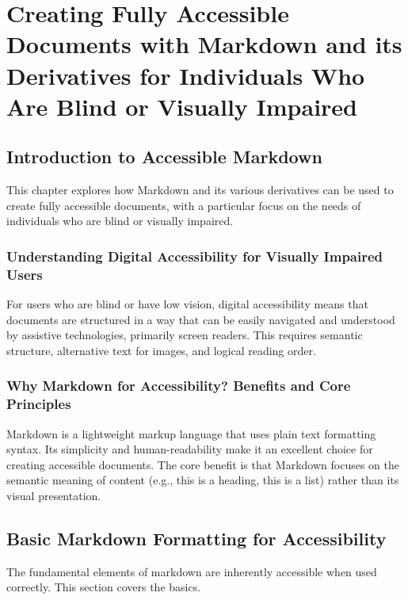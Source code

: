 \chapter{Creating Fully Accessible Documents with Markdown and its Derivatives for Individuals Who Are Blind or Visually Impaired}
\label{chap:markdown-accessibility}

\section{Introduction to Accessible Markdown}
\label{sec:intro-accessible-markdown}
This chapter explores how Markdown and its various derivatives can be used to create fully accessible documents, with a particular focus on the needs of individuals who are blind or visually impaired.

\subsection{Understanding Digital Accessibility for Visually Impaired Users}
\label{subsec:digital-accessibility-vi}
For users who are blind or have low vision, digital accessibility means that documents are structured in a way that can be easily navigated and understood by assistive technologies, primarily screen readers. This requires semantic structure, alternative text for images, and logical reading order.

\subsection{Why Markdown for Accessibility? Benefits and Core Principles}
\label{subsec:why-markdown-for-accessibility}
Markdown is a lightweight markup language that uses plain text formatting syntax. Its simplicity and human-readability make it an excellent choice for creating accessible documents. The core benefit is that Markdown focuses on the semantic meaning of content (e.g., this is a heading, this is a list) rather than its visual presentation.

\section{Basic Markdown Formatting for Accessibility}
\label{sec:basic-markdown-formatting}
The fundamental elements of \gls{markdown} are inherently accessible when used correctly. This section covers the basics.

